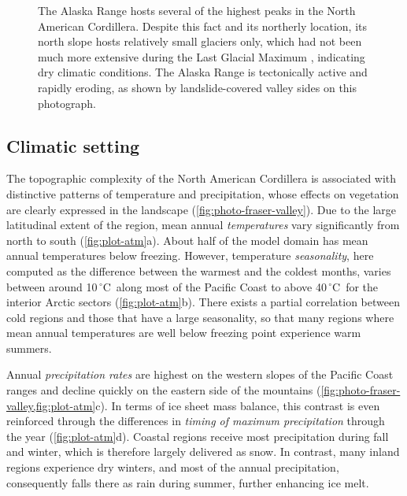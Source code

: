 \documentclass{article}
\newcommand{\unit}[1]{\ensuremath{\mathrm{#1}}}
\newcommand{\degree}[0]{\ensuremath{^{\circ}}}
\newcommand{\degC}[0]{\unit{{\degree}C}}
\begin{document}
\begin{figure}
  \centering
  \caption{The Alaska Range hosts several of the highest peaks in the North
           American Cordillera. Despite this fact and its northerly location,
           its north slope hosts relatively small glaciers only, which had not
           been much more extensive during the Last Glacial Maximum
           \citep{Kaufman.Manley.2004}, indicating dry climatic conditions.
           The Alaska Range is tectonically active and rapidly eroding, as
           shown by landslide-covered valley sides on this photograph.}
  \label{fig:photo-alaska-range}
\end{figure}

\subsection{Climatic setting}

The topographic complexity of the North American Cordillera is associated with
distinctive patterns of temperature and precipitation, whose effects on
vegetation are clearly expressed in the landscape
(\cref{fig:photo-fraser-valley}). Due to the large latitudinal extent of the
region, mean annual \emph{temperatures} vary significantly from north to south
(\cref{fig:plot-atm}a). About half of the model domain has mean annual
temperatures below freezing. However, temperature \emph{seasonality},
here computed as the difference between the warmest and the coldest months,
varies between around 10\,\degC\ along most of the Pacific Coast to above
40\,\degC\ for the interior Arctic sectors
(\cref{fig:plot-atm}b). There exists a
partial correlation between cold regions and those that have a large
seasonality, so that many regions where mean annual temperatures are well below
freezing point experience warm summers.

Annual \emph{precipitation rates} are highest on the western slopes of the
Pacific Coast ranges and decline quickly on the eastern side of the mountains
(\cref{fig:photo-fraser-valley,fig:plot-atm}c). In terms of ice sheet
mass balance, this contrast is even reinforced through the differences in
\emph{timing of maximum precipitation} through the year (\cref{fig:plot-atm}d).
Coastal regions receive most precipitation during fall and winter, which is
therefore largely delivered as snow. In contrast, many inland regions
experience dry winters, and most of the annual precipitation, consequently
falls there as rain during summer, further enhancing ice melt.
\end{document}
